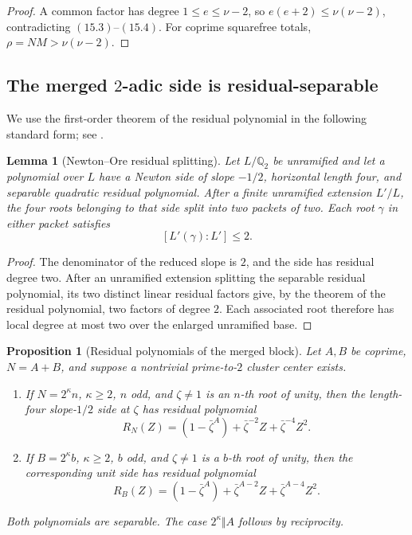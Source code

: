 \documentclass[11pt]{article}
\newtheorem{proposition}[theorem]{Proposition}
\newtheorem{lemma}[theorem]{Lemma}
\theoremstyle{definition}
\newcommand{\Q}{\mathbb Q}
\begin{document}
\begin{proof}
A common factor has degree \(1\leq e\leq\nu-2\), so
\(e(e+2)\leq\nu(\nu-2)\), contradicting \((15.3)\)--\((15.4)\).
For coprime squarefree totals, \(\rho=NM>\nu(\nu-2)\).
\end{proof}

\subsection{The merged \texorpdfstring{\(2\)}{2}-adic side is residual-separable}

We use the first-order theorem of the residual polynomial in the following
standard form; see \cite[Theorem~1.21]{GuardiaMontesNart2008}.

\begin{lemma}[Newton--Ore residual splitting]
\label{lem:oreresidual}
Let \(L/\Q_2\) be unramified and let a polynomial over \(L\) have a
Newton side of slope \(-1/2\), horizontal length four, and separable
quadratic residual polynomial.  After a finite unramified extension
\(L'/L\), the four roots belonging to that side split into two packets of
two.  Each root \(\gamma\) in either packet satisfies
\[
 [L'(\gamma):L']\leq2.
\]
\end{lemma}

\begin{proof}
The denominator of the reduced slope is \(2\), and the side has residual
degree two.  After an unramified extension splitting the separable residual
polynomial, its two distinct linear residual factors give, by the theorem of
the residual polynomial, two factors of degree \(2\).  Each associated root
therefore has local degree at most two over the enlarged unramified base.
\end{proof}

\begin{proposition}[Residual polynomials of the merged block]
\label{prop:mergedtwo}
Let \(A,B\) be coprime, \(N=A+B\), and suppose a nontrivial
prime-to-\(2\) cluster center exists.
\begin{enumerate}[label=(\alph*)]
\item If \(N=2^\kappa n\), \(\kappa\geq2\), \(n\) odd, and
\(\zeta\neq1\) is an \(n\)-th root of unity, then the length-four
slope-\(1/2\) side at \(\zeta\) has residual polynomial
\[
 R_N(Z)=(1-\bar\zeta^A)+\bar\zeta^{-2}Z+
        \bar\zeta^{-4}Z^2.
\]
\item If \(B=2^\kappa b\), \(\kappa\geq2\), \(b\) odd, and
\(\zeta\neq1\) is a \(b\)-th root of unity, then the corresponding unit
side has residual polynomial
\[
 R_B(Z)=(1-\bar\zeta^A)+\bar\zeta^{A-2}Z+
        \bar\zeta^{A-4}Z^2.
\]
\end{enumerate}
Both polynomials are separable.  The case \(2^\kappa\Vert A\) follows by
reciprocity.
\end{proposition}
\end{document}
